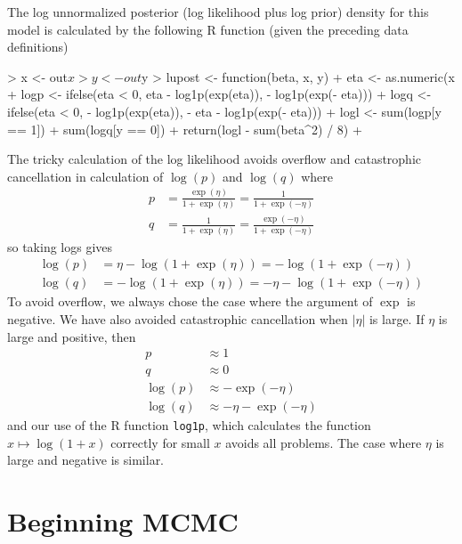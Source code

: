 \documentclass{article}
\begin{document}
The log unnormalized posterior (log likelihood plus log prior) density
for this model is calculated by
the following R function (given the preceding data definitions)
\begin{Schunk}
\begin{Sinput}
> x <- out$x
> y <- out$y
> lupost <- function(beta, x, y) {
+     eta <- as.numeric(x %*% beta)
+     logp <- ifelse(eta < 0, eta - log1p(exp(eta)), - log1p(exp(- eta)))
+     logq <- ifelse(eta < 0, - log1p(exp(eta)), - eta - log1p(exp(- eta)))
+     logl <- sum(logp[y == 1]) + sum(logq[y == 0])
+     return(logl - sum(beta^2) / 8)
+ }
\end{Sinput}
\end{Schunk}
The tricky calculation of the log likelihood avoids overflow and catastrophic
cancellation in calculation of $\log(p)$ and $\log(q)$ where
\begin{align*}
   p & = \frac{\exp(\eta)}{1 + \exp(\eta)} = \frac{1}{1 + \exp(- \eta)}
   \\
   q & = \frac{1}{1 + \exp(\eta)} = \frac{\exp(- \eta)}{1 + \exp(- \eta)}
\end{align*}
so taking logs gives
\begin{align*}
   \log(p) & = \eta - \log(1 + \exp(\eta)) = - \log(1 + \exp(- \eta))
   \\
   \log(q) & = - \log(1 + \exp(\eta)) = - \eta - \log(1 + \exp(- \eta))
\end{align*}
To avoid overflow, we always chose the case where the argument of $\exp$
is negative.  We have also avoided catastrophic cancellation when
$\lvert\eta\rvert$ is large.  If $\eta$ is large and positive, then
\begin{align*}
   p & \approx 1
   \\
   q & \approx 0
   \\
   \log(p) & \approx - \exp(- \eta)
   \\
   \log(q) & \approx - \eta - \exp(- \eta)
\end{align*}
and our use of the R function \texttt{log1p}, which calculates the
function $x \mapsto \log(1 + x)$
correctly for small $x$ avoids all problems.  The case where $\eta$ is large
and negative is similar.

\section{Beginning MCMC}
\end{document}
